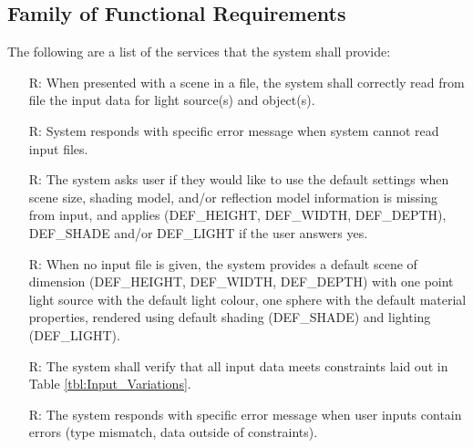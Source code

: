 \documentclass[12pt]{article}
\newcounter{reqnum} %
\begin{document}
\subsection{Family of Functional Requirements}
The following are a list of the services that the system shall provide:
\noindent 
\begin{itemize}
	\item[R\refstepcounter{reqnum}\thereqnum \label{R_Inputs1}:] When presented 
	with a scene in a file, the system shall correctly read from file the 
	input data for light source(s) and object(s).

	\item[R\refstepcounter{reqnum}\thereqnum \label{R_Inputs1Err}:]System 
	responds with specific error message when system cannot read input files.
	
	\item[R\refstepcounter{reqnum}\thereqnum \label{R_Inputs1Err-Def}:]	The 
	system asks user if they would like to use the default settings when scene 
	size, shading model, and/or reflection model information is missing from 
	input, and applies (DEF\_HEIGHT, DEF\_WIDTH, DEF\_DEPTH), DEF\_SHADE and/or 
	DEF\_LIGHT if the user answers yes.

	\item[R\refstepcounter{reqnum}\thereqnum \label{R_DefaultScene}:]When no 
	input file is given, the system provides a default scene of dimension 
	(DEF\_HEIGHT, DEF\_WIDTH, DEF\_DEPTH) with one point light source with the 
	default light colour, one sphere with the default material properties, 
	rendered using default shading (DEF\_SHADE) and lighting (DEF\_LIGHT).
	
	\item[R\refstepcounter{reqnum}\thereqnum \label{R_Inputs2}:]The system 
	shall verify that all input data meets constraints laid out in Table 
	\ref{tbl:Input_Variations}.

	\item[R\refstepcounter{reqnum}\thereqnum \label{R_Inputs2Err}:] The system 
	responds with specific error message when user inputs contain errors (type 
	mismatch, data outside of constraints).
	

\end{itemize}
\end{document}
